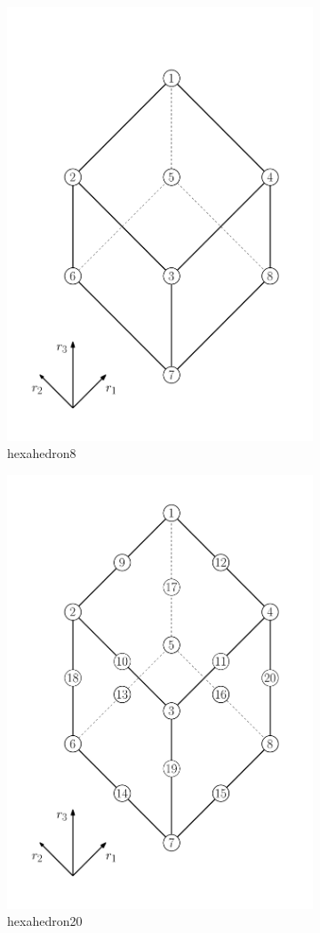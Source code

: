 \begin{figure}[htb]
  \begin{subfigure}{0.5\textwidth}
    \centering
    \includegraphics[width=.5\textwidth]{hexahedron8}
    \caption{hexahedron8}
    \label{fig:EL:SOLID:HEXAHEDRON8}
  \end{subfigure}
  \begin{subfigure}{0.5\textwidth}
    \centering
    \includegraphics[width=.5\textwidth]{hexahedron20}
    \caption{hexahedron20}
    \label{fig:EL:SOLID:HEXAHEDRON20}
  \end{subfigure}
  \begin{subfigure}{0.5\textwidth}
    \centering

\end{subfigure}
\end{figure}

